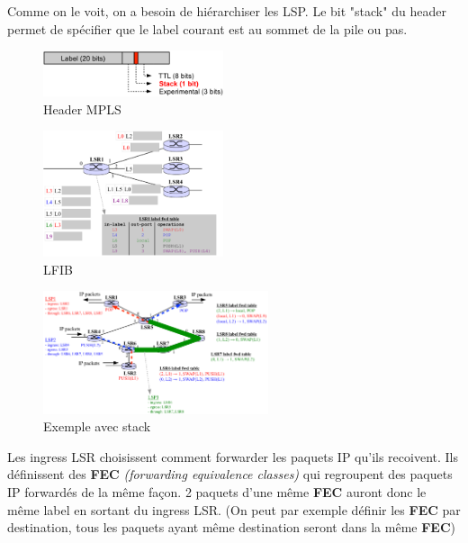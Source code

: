 \documentclass{article}
\begin{document}
\begin{sffamily}
Comme on le voit, on a besoin de hiérarchiser les LSP. Le bit "stack" du header permet de spécifier que le label courant est au 
sommet de la pile ou pas.
\begin{figure}[h!]
    \begin{center}
    \includegraphics[width=200px]{img_009.pdf}
    \caption{Header MPLS}
    \end{center}	
\end{figure}

\begin{figure}[h!]
    \begin{center}
    \includegraphics[width=200px]{img_010.pdf}
    \caption{LFIB}
    \end{center}	
\end{figure}

\begin{figure}[h!]
    \begin{center}
    \includegraphics[width=250px]{img_011.pdf}
    \caption{Exemple avec stack}
    \end{center}	
\end{figure}

Les ingress LSR choisissent comment forwarder les paquets IP qu'ils recoivent. Ils définissent des \textbf{FEC} 
\textit{(forwarding equivalence classes)} qui regroupent des paquets IP forwardés de la même façon. 2 paquets d'une même 
\textbf{FEC} auront donc le même label en sortant du ingress LSR. (On peut par exemple définir les \textbf{FEC} par destination, 
tous les paquets ayant même destination seront dans la même \textbf{FEC})


\end{sffamily}
\end{document}
